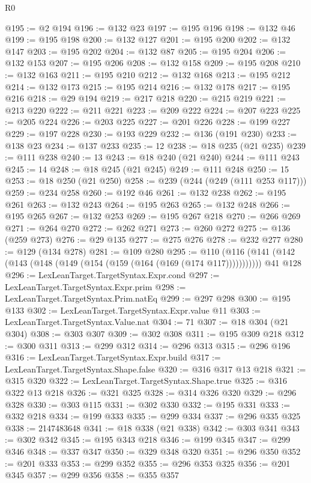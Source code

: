 \begin{lexlean}{R0}
\begin{coremodule}
@195 := @2 @194
@196 := @132 @23
@197 := @195 @196
@198 := @132 @46
@199 := @195 @198
@200 := @132 @127
@201 := @195 @200
@202 := @132 @147
@203 := @195 @202
@204 := @132 @87
@205 := @195 @204
@206 := @132 @153
@207 := @195 @206
@208 := @132 @158
@209 := @195 @208
@210 := @132 @163
@211 := @195 @210
@212 := @132 @168
@213 := @195 @212
@214 := @132 @173
@215 := @195 @214
@216 := @132 @178
@217 := @195 @216
@218 := @29 @194
@219 := @217 @218
@220 := @215 @219
@221 := @213 @220
@222 := @211 @221
@223 := @209 @222
@224 := @207 @223
@225 := @205 @224
@226 := @203 @225
@227 := @201 @226
@228 := @199 @227
@229 := @197 @228
@230 := @193 @229
@232 := @136 (@191 @230)
@233 := @138 @23
@234 := @137 @233
@235 := 12
@238 := @18 @235 (@21 @235)
@239 := @111 @238
@240 := 13
@243 := @18 @240 (@21 @240)
@244 := @111 @243
@245 := 14
@248 := @18 @245 (@21 @245)
@249 := @111 @248
@250 := 15
@253 := @18 @250 (@21 @250)
@258 := @239 (@244 (@249 (@111 @253 @117)))
@259 := @234 @258
@260 := @192 @46
@261 := @132 @238
@262 := @195 @261
@263 := @132 @243
@264 := @195 @263
@265 := @132 @248
@266 := @195 @265
@267 := @132 @253
@269 := @195 @267 @218
@270 := @266 @269
@271 := @264 @270
@272 := @262 @271
@273 := @260 @272
@275 := @136 (@259 @273)
@276 := @29 @135
@277 := @275 @276
@278 := @232 @277
@280 := @129 (@134 @278)
@281 := @109 @280
@295 := @110
    (@116 (@141 (@142 (@143 (@148 (@149 (@154 (@159 (@164 (@169 (@174 @117)))))))))))
    @41
    @128
@296 := LexLeanTarget.TargetSyntax.Expr.cond
@297 := LexLeanTarget.TargetSyntax.Expr.prim
@298 := LexLeanTarget.TargetSyntax.Prim.natEq
@299 := @297 @298
@300 := @195 @133
@302 := LexLeanTarget.TargetSyntax.Expr.value @11
@303 := LexLeanTarget.TargetSyntax.Value.nat
@304 := 71
@307 := @18 @304 (@21 @304)
@308 := @303 @307
@309 := @302 @308
@311 := @195 @309 @218
@312 := @300 @311
@313 := @299 @312
@314 := @296 @313
@315 := @296 @196
@316 := LexLeanTarget.TargetSyntax.Expr.build
@317 := LexLeanTarget.TargetSyntax.Shape.false
@320 := @316 @317 @13 @218
@321 := @315 @320
@322 := LexLeanTarget.TargetSyntax.Shape.true
@325 := @316 @322 @13 @218
@326 := @321 @325
@328 := @314 @326 @320
@329 := @296 @328
@330 := @303 @115
@331 := @302 @330
@332 := @195 @331
@333 := @332 @218
@334 := @199 @333
@335 := @299 @334
@337 := @296 @335 @325
@338 := 2147483648
@341 := @18 @338 (@21 @338)
@342 := @303 @341
@343 := @302 @342
@345 := @195 @343 @218
@346 := @199 @345
@347 := @299 @346
@348 := @337 @347
@350 := @329 @348 @320
@351 := @296 @350
@352 := @201 @333
@353 := @299 @352
@355 := @296 @353 @325
@356 := @201 @345
@357 := @299 @356
@358 := @355 @357

\end{coremodule}
\end{lexlean}
